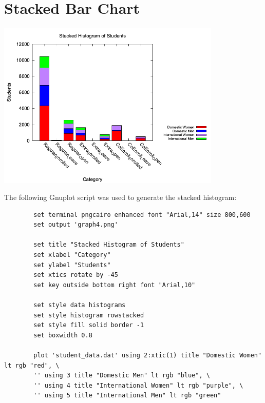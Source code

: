 \documentclass{article}
\begin{document}
	\section{Stacked Bar Chart}
	\begin{minipage}{\textwidth}
		\centering
		\includegraphics[width=0.8\textwidth]{graph4.png}
		\label{fig:stacked}
	\end{minipage}
	
	\vspace{1em}
	
	\noindent The following Gnuplot script was used to generate the stacked histogram:
	\begin{lstlisting}
		set terminal pngcairo enhanced font "Arial,14" size 800,600
		set output 'graph4.png'
		
		set title "Stacked Histogram of Students"
		set xlabel "Category"
		set ylabel "Students"
		set xtics rotate by -45
		set key outside bottom right font "Arial,10"
		
		set style data histograms
		set style histogram rowstacked
		set style fill solid border -1
		set boxwidth 0.8
		
		plot 'student_data.dat' using 2:xtic(1) title "Domestic Women" lt rgb "red", \
		'' using 3 title "Domestic Men" lt rgb "blue", \
		'' using 4 title "International Women" lt rgb "purple", \
		'' using 5 title "International Men" lt rgb "green"
	\end{lstlisting}
	
	\clearpage
	
\end{document}
